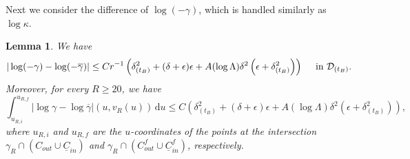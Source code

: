 \documentclass[10pt, reqno]{amsart}
\newtheorem{lemma}[theorem]{Lemma}
\theoremstyle{definition}
\theoremstyle{remark}
\theoremstyle{conjecture}
\numberwithin{equation}{section}
\newcommand{\abs}[1]{\vert#1\vert}
\newcommand{\ud}{\mathrm{d}}
\newcommand{\0}{\emptyset}
\newcommand{\gmm}{\gamma}
\newcommand{\dlt}{\delta}
\newcommand{\eps}{\epsilon}
\newcommand{\kpp}{\kappa}
\newcommand{\Lmb}{\Lambda}
\newcommand{\calD}{\mathcal D}
\newcommand{\uC}{\underline{C}}
\newcommand{\dur}{\nu}
\newcommand{\gmmbg}{\overline{\gmm}}					%
\newcommand{\Abs}[1]{\left\vert #1 \right\vert}
\begin{document}
Next we consider the difference of $\log(-\gamma)$, which is handled similarly as $\log \kpp$.
\begin{lemma} \label{lem:btstrp-pf:gmm}
We have
\begin{equation}  \label{eq:btstrp-pf:gmm}
	\abs{\log (-\gmm) - \log (-\gmmbg)} \leq C r^{-1} \left( \dlt_{(t_{B})}^{2} + (\dlt + \eps) \eps + A (\log \Lmb) \dlt^{2} \left( \eps + \dlt_{(t_{B})}^{2} \right) \right)  \quad \hbox{ in } \calD_{(t_{B})}.
\end{equation}
Moreover, for every $R \geq 20$, we have
\begin{equation} \label{eq:btstrp-pf:gmm-int}
	\int_{u_{R, i}}^{u_{R, f}} \Abs{\log \gmm - \log \gmmbg}(u, v_{R}(u)) \, \ud u
	\leq C \left( \dlt_{(t_{B})}^{2} + (\dlt + \eps) \eps + A (\log \Lmb) \dlt^{2} \left( \eps + \dlt_{(t_{B})}^{2} \right) \right),
\end{equation}
where $u_{R, i}$ and $u_{R, f}$ are the $u$-coordinates of the points at the intersection $\gmm_{R} \cap (C_{out} \cup \uC_{in})$ and $\gmm_{R} \cap (C^{f}_{out} \cup \uC^{f}_{in})$, respectively.
\end{lemma}
\end{document}
